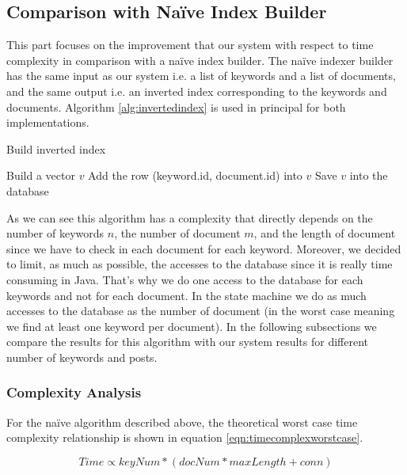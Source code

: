 \documentclass[10pt]{report}
\begin{document}
\subsection{Comparison with Na\"{i}ve Index Builder}
This part focuses on the improvement that our system with respect to
time complexity in comparison with a na\"{i}ve index builder. The na\"{i}ve
indexer builder has the same input as our system i.e. a list of
keywords and a list of documents, and the same output i.e. an inverted
index corresponding to the keywords and documents. Algorithm
\ref{alg:invertedindex} is used in principal for both implementations.


\begin{algorithm}
\caption{Build inverted index}
\label{alg:invertedindex}
\begin{algorithmic}
  \STATE Build a vector $v$
  \STATE Add the row (keyword.id, document.id) into $v$
  \ENDFOR
  \STATE Save $v$ into the database
  \ENDFOR
\end{algorithmic}
\end{algorithm}

As we can see this algorithm has a complexity that directly depends on
the number of keywords $n$, the number of document $m$, and the length
of document since we have to check in each document for each
keyword. Moreover, we decided to limit, as much as possible, the
accesses to the database since it is really time consuming in
Java. That’s why we do one access to the database for each keywords
and not for each document. In the state machine we do as much accesses
to the database as the number of document (in the worst case meaning
we find at least one keyword per document). In the following
subsections we compare the results for this algorithm with our system
results for different number of keywords and posts.


\subsubsection{Complexity Analysis}
For the na\"{i}ve algorithm described above, the theoretical worst
case time complexity relationship is shown in equation
\ref{eqn:timecomplexworstcase}.  

\begin{equation}
\label{eqn:timecomplexworstcase}
Time \propto keyNum * ( docNum * maxLength + conn)
\end{equation}
\end{document}
